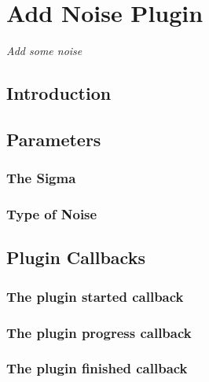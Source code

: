 \chapter{Add Noise Plugin}
\emph{Add some noise}
\section{Introduction}
\section{Parameters}
\subsection{The Sigma}
\subsection{Type of Noise}
\section{Plugin Callbacks}
\subsection{The plugin started callback}
\subsection{The plugin progress callback}
\subsection{The plugin finished callback}
